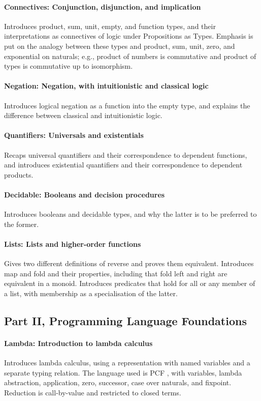 \documentclass[preprint,authoryear]{elsarticle}
\begin{document}
\paragraph{Connectives: Conjunction, disjunction, and implication}
Introduces product, sum, unit, empty, and function types, and their
interpretations as connectives of logic under Propositions as Types.
Emphasis is put on the analogy between these types and product, sum,
unit, zero, and exponential on naturals; e.g., product of numbers is
commutative and product of types is commutative up to isomorphism.

\paragraph{Negation: Negation, with intuitionistic and classical logic}
Introduces logical negation as a function into the empty
type, and explains the difference between classical and intuitionistic
logic.

\paragraph{Quantifiers: Universals and existentials}
Recaps universal quantifiers and their correspondence to dependent
functions, and introduces existential quantifiers and their
correspondence to dependent products.

\paragraph{Decidable: Booleans and decision procedures}
Introduces booleans and decidable types, and why the latter is to be
preferred to the former.

\paragraph{Lists: Lists and higher-order functions}
Gives two different definitions of reverse and proves them equivalent.
Introduces map and fold and their properties, including that fold left
and right are equivalent in a monoid.  Introduces predicates that hold
for all or any member of a list, with membership as a specialisation
of the latter.

\subsection*{Part II, Programming Language Foundations}

\paragraph{Lambda: Introduction to lambda calculus}
Introduces lambda calculus, using a representation with named
variables and a separate typing relation. The language used is PCF
\citep{Plotkin-1977}, with variables, lambda abstraction, application,
zero, successor, case over naturals, and fixpoint. Reduction is
call-by-value and restricted to closed terms.
\end{document}
